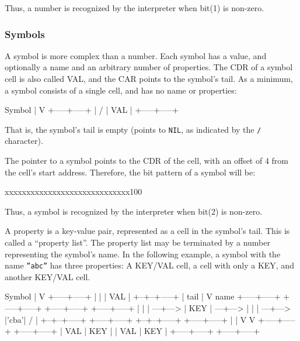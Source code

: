 Thus, a number is recognized by the interpreter when bit(1) is non-zero.


\subsubsection{Symbols}
\label{sec:refm-symbols}%
A symbol is more complex than a number. Each symbol has a value, and
optionally a name and an arbitrary number of properties. The CDR of a
symbol cell is also called VAL, and the CAR points to the symbol's tail.
As a minimum, a symbol consists of a single cell, and has no name or
properties:


\begin{wideverbatim}
      Symbol
      |
      V
+-----+-----+
|  /  | VAL |
+-----+-----+
\end{wideverbatim}

That is, the symbol's tail is empty (points to \texttt{NIL}, as indicated by
the  \texttt{/}  character).

The pointer to a symbol points to the CDR of the cell, with an offset of
4 from the cell's start address. Therefore, the bit pattern of a symbol
will be:


\begin{wideverbatim}
xxxxxxxxxxxxxxxxxxxxxxxxxxxxx100
\end{wideverbatim}

Thus, a symbol is recognized by the interpreter when bit(2) is non-zero.

A property is a key-value pair, represented as a cell in the symbol's
tail. This is called a ``property list''. The property list may be
terminated by a number representing the symbol's name. In the following
example, a symbol with the name \texttt{''abc''} has three properties: A KEY/VAL
cell, a cell with only a KEY, and another KEY/VAL cell.


\begin{wideverbatim}
      Symbol
      |
      V
+-----+-----+
|  |  | VAL |
+--+--+-----+
   | tail
   |
   V                                                      name
   +-----+-----+     +-----+-----+     +-----+-----+     +-----+-----+
   |  |  |  ---+---> | KEY |  ---+---> |  |  |  ---+---> |'cba'|  /  |
   +--+--+-----+     +-----+-----+     +--+--+-----+     +-----+-----+
      |                                   |
      V                                   V
      +-----+-----+                       +-----+-----+
      | VAL | KEY |                       | VAL | KEY |
      +-----+-----+                       +-----+-----+
\end{wideverbatim}

